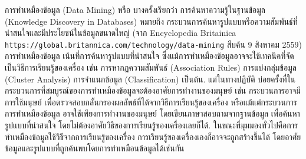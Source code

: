 {\small
\begin{shaded}
%
การทำเหมืองข้อมูล (Data Mining) หรือ บางครั้งเรียกว่า การค้นหาความรู้ในฐานข้อมูล (Knowledge Discovery in Databases) หมายถึง กระบวนการค้นหารูปแบบหรือความสัมพันธ์ที่น่าสนใจและมีประโยชน์ในข้อมูลขนาดใหญ่
{\footnotesize (จาก Encyclopedia Britainica \verb|https://global.britannica.com/technology/data-mining| สืบค้น 9 สิงหาคม 2559)}
%
การทำเหมืองข้อมูล เน้นที่การค้นหารูปแบบที่น่าสนใจ 
ซึ่งแม้การทำเหมืองข้อมูลอาจจะใช้เทคนิคที่จัดเป็นวิธีการเรียนรู้ของเครื่อง เช่น การหากฏความสัมพันธ์ (Association Rules) การแบ่งกลุ่มข้อมูล (Cluster Analysis) การจำแนกข้อมูล (Classification) เป็นต้น.
แต่ในทางปฏิบัติ บ่อยครั้งที่ในกระบวนการที่สมบูรณ์ของการทำเหมืองข้อมูลจะต้องอาศัยการทำงานของมนุษย์ เช่น กระบวนการอาจมีการใช้มนุษย์ เพื่อตรวจสอบกลั้นกรองผลลัพธ์ที่ได้จากวิธีการเรียนรู้ของเครื่อง
หรือแม้แต่กระบวนการการทำเหมืองข้อมูล อาจใช้เพียงการทำงานของมนุษย์ โดยเขียนภาษาสอบถามจากฐานข้อมูล เพื่อค้นหารูปแบบที่น่าสนใจ โดยไม่ต้องอาศัยวิธีของการเรียนรู้ของเครื่องเลยก็ได้.
%
ในขณะที่มุมมองทั่วไปคือการทำเหมืองข้อมูลใช้วิธีจากการเรียนรู้ของเครื่อง 
การเรียนรู้ของเครื่องเองก็อาจจะถูกสร้างขึ้นได้ 
โดยอาศัยข้อมูลและรูปแบบที่ถูกค้นพบโดยการทำเหมือนข้อมูลได้เช่นกัน
\end{shaded}
}


